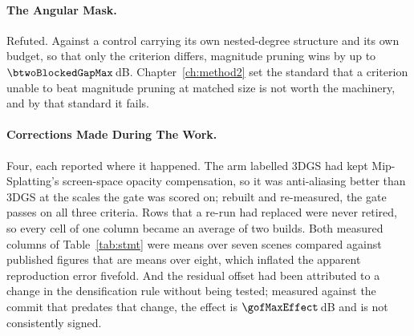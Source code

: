 \paragraph{The Angular Mask.} Refuted. Against a control carrying its own
nested-degree structure and its own budget, so that only the criterion differs,
magnitude pruning wins by up to $\btwoBlockedGapMax$\,dB.
Chapter~\ref{ch:method2} set the standard that a criterion unable to beat
magnitude pruning at matched size is not worth the machinery, and by that
standard it fails.

\paragraph{Corrections Made During The Work.} Four, each reported where it
happened. The arm labelled 3DGS had kept Mip-Splatting's screen-space opacity
compensation, so it was anti-aliasing better than 3DGS at the scales the gate
was scored on; rebuilt and re-measured, the gate passes on all three criteria.
Rows that a re-run had replaced were never retired, so every cell of one column
became an average of two builds. Both measured columns of
Table~\ref{tab:stmt} were means over seven scenes compared against published
figures that are means over eight, which inflated the apparent reproduction
error fivefold. And the residual offset had been attributed to a change in the
densification rule without being tested; measured against the commit that
predates that change, the effect is $\gofMaxEffect$\,dB and is not consistently
signed.
\clearpage
